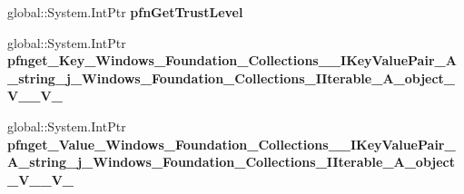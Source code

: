 \begin{DoxyCompactItemize}
\mbox{\label{struct_system_1_1_collections_1_1_generic_1_1_key_value_pair___a__string__j___system___collectiob611aa8205ecce9d7fe907374986c9f4_aa33242ba46cb757646541b6708502738}} 
global\+::\+System.\+Int\+Ptr {\bfseries pfn\+Get\+Trust\+Level}
\item 
\mbox{\label{struct_system_1_1_collections_1_1_generic_1_1_key_value_pair___a__string__j___system___collectiob611aa8205ecce9d7fe907374986c9f4_a466beae34b29ffe8744cc1bbaf797ba9}} 
global\+::\+System.\+Int\+Ptr {\bfseries pfnget\+\_\+\+Key\+\_\+\+Windows\+\_\+\+Foundation\+\_\+\+Collections\+\_\+\+\_\+\+I\+Key\+Value\+Pair\+\_\+\+A\+\_\+string\+\_\+j\+\_\+\+Windows\+\_\+\+Foundation\+\_\+\+Collections\+\_\+\+I\+Iterable\+\_\+\+A\+\_\+object\+\_\+\+V\+\_\+\+\_\+\+V\+\_\+}
\item 
\mbox{\label{struct_system_1_1_collections_1_1_generic_1_1_key_value_pair___a__string__j___system___collectiob611aa8205ecce9d7fe907374986c9f4_a38b531e3eb0341512429a176b6849931}} 
global\+::\+System.\+Int\+Ptr {\bfseries pfnget\+\_\+\+Value\+\_\+\+Windows\+\_\+\+Foundation\+\_\+\+Collections\+\_\+\+\_\+\+I\+Key\+Value\+Pair\+\_\+\+A\+\_\+string\+\_\+j\+\_\+\+Windows\+\_\+\+Foundation\+\_\+\+Collections\+\_\+\+I\+Iterable\+\_\+\+A\+\_\+object\+\_\+\+V\+\_\+\+\_\+\+V\+\_\+}
\end{DoxyCompactItemize}
